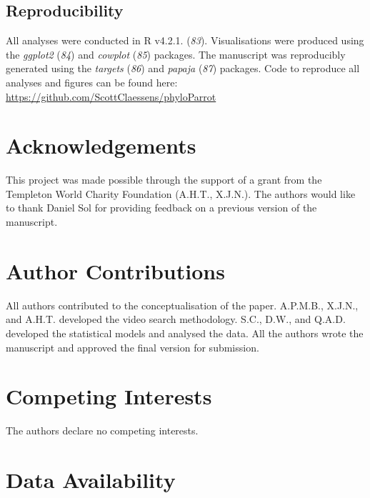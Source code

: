 \documentclass[
  man,floatsintext]{apa6}
\begin{document}
\hypertarget{reproducibility}{%
\subsection{Reproducibility}\label{reproducibility}}

All analyses were conducted in R v4.2.1. (\emph{83}). Visualisations were
produced using the \emph{ggplot2} (\emph{84}) and \emph{cowplot} (\emph{85}) packages.
The manuscript was reproducibly generated using the \emph{targets} (\emph{86}) and
\emph{papaja} (\emph{87}) packages. Code to reproduce all analyses and figures can be
found here: \url{https://github.com/ScottClaessens/phyloParrot}

\newpage
\nolinenumbers

\hypertarget{acknowledgements}{%
\section{Acknowledgements}\label{acknowledgements}}

This project was made possible through the support of a grant from the Templeton
World Charity Foundation (A.H.T., X.J.N.). The authors would like to thank
Daniel Sol for providing feedback on a previous version of the manuscript.

\hypertarget{author-contributions}{%
\section{Author Contributions}\label{author-contributions}}

All authors contributed to the conceptualisation of the paper. A.P.M.B., X.J.N.,
and A.H.T. developed the video search methodology. S.C., D.W., and Q.A.D.
developed the statistical models and analysed the data. All the authors wrote
the manuscript and approved the final version for submission.

\hypertarget{competing-interests}{%
\section{Competing Interests}\label{competing-interests}}

The authors declare no competing interests.

\hypertarget{data-availability}{%
\section{Data Availability}\label{data-availability}}
\end{document}
